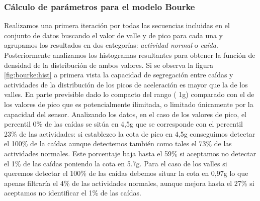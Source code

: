 




\begin{comment}
Los estudios siguientes demuestran que el filtrado de ruido mejora la capacidad de tratamiento posterior
Tian, T.; Sun, S.; Lin, H. Distributed fusion filter for multi-sensor systems with finite-step correlated noises. Inf. Fusion 2019, 46, 128-140.

Luego, para el caso de natación
Xiao, D.; Yu, Z.; Yi, F.; Wang, L.; Tan, C.C.; Guo, B. Smartswim: An infrastructure-free swimmer localization system based on smartphone sensors. In Proceedings of the International Conference on Smart Homes and Health Telematics, Wuhan, China, 25-27 May 2016; pp. 222-234.

decide que una promediado por ventana flotante de tamaño M es el que mejores resultados da: $G_{filter}=\frac{1}{M}\sum_{i=0}^{M}G_i$. (Explicado en Liu \cite{Liu2020} que usa este método con una DeepNN basada en capas CNN + 2xLSTM + Fully Connected + Softmax).

\end{comment}

\subsubsection{Cálculo de parámetros para el modelo Bourke}

Realizamos una primera iteración por todas las secuencias incluidas en el conjunto de datos buscando el valor de valle y de pico para cada una y agrupamos los resultados en dos categorías: \textit{actividad normal} o \textit{caída}. Posteriormente analizamos los histogramas resultantes para obtener la función de densidad de la distribución de ambos valores. Si se observa la figura \ref{fig:bourke:hist} a primera vista la capacidad de segregación entre caídas y actividades de la distribución de los picos de aceleración es mayor que la de los valles. En parte previsible dado lo compacto del rango ( 1g) comparado con el de los valores de pico que es potencialmente ilimitada, o limitado únicamente por la capacidad del sensor. Analizando los datos, en el caso de los valores de pico, el percentil 0\% de las caídas se sitúa en 4,5g que se corresponde con el percentil 23\% de las actividades: si establezco la cota de pico en 4,5g conseguimos detectar el 100\% de la caídas aunque detectemos también como tales el 73\% de las actividades normales. Este porcentaje baja hasta el 59\% si aceptamos no detectar el 1\% de las caídas poniendo la cota en 5.7g. Para el caso de los valles si queremos detectar el 100\% de las caídas debemos situar la cota en 0,97g lo que apenas filtraría el 4\% de las actividades normales, aunque mejora hasta el 27\% si aceptamos no identificar el 1\% de las caídas.

